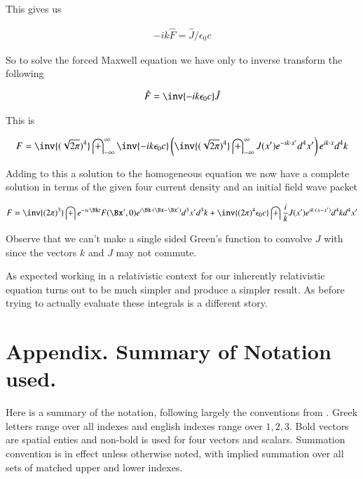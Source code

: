 \documentclass{article}
\newcommand{\IIinf}[0]{ \int_{-\infty}^\infty }
\begin{document}
This gives us

\begin{align*}
-i k \hat{F} = \hat{J}/\epsilon_0 c
\end{align*}

So to solve the forced Maxwell equation we have only to inverse transform the following

\begin{align*}
\hat{F} = \inv{ -i k \epsilon_0 c} \hat{J}
\end{align*}

This is 

\begin{align*}
{F} 
&= \inv{(\sqrt{2\pi})^4} \IIinf \inv{ -i k \epsilon_0 c} \left( \inv{(\sqrt{2\pi})^4} \IIinf J(x') e^{ -i k \cdot x' } d^4 x' \right) e^{ i k \cdot x } d^4 k \\
\end{align*}

Adding to this a solution to the homogeneous equation we now have a complete solution in terms of the given four current density and an
initial field wave packet

\begin{align*}
{F} &= 
\inv{({2\pi})^3} \int e^{ -i c \Bk t } F(\Bx', 0) e^{ i \Bk \cdot (\Bx-\Bx') } d^3 x' d^3 k  
+
\inv{ ({2\pi})^4 \epsilon_0 c} \int \frac{i}{ k } J(x') e^{ i k \cdot (x - x') } d^4 k d^4 x' \\
\end{align*}

Observe that we can't make a single sided Green's function to convolve $J$ with since the vectors $k$ and $J$ may not commute.

As expected working in a relativistic context for our inherently relativistic equation turns out to be much simpler and produce a simpler result.  As before 
trying to actually evaluate these integrals is a different story.

\section{ Appendix.  Summary of Notation used. }

% 
%
Here is a summary of the notation, following largely the conventions from
\cite{doran2003gap}.
Greek letters range over all indexes and
english indexes range over $1,2,3$.  Bold vectors are spatial enties and non-bold is used for four vectors and scalars.
Summation convention is in effect unless otherwise noted, with implied summation over all sets of matched upper and lower indexes.
\end{document}
